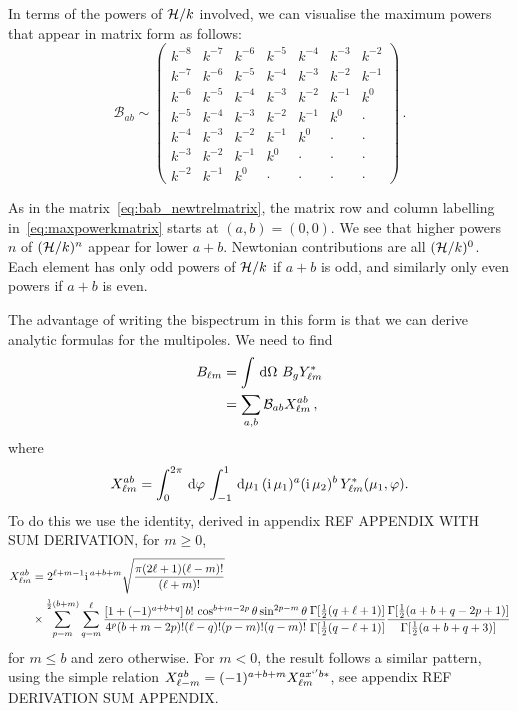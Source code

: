 In terms of the powers of $\mathcal{H}/k$ involved, we can visualise the maximum powers that appear in matrix form as follows:
\begin{equation}  \label{eq:maxpowerkmatrix}
\mathcal{B}_{ab}\sim \left( \begin {array}{ccccccc} {k}^{-8}&{k}^{-7}&{k}^{-6}&{k}^{-5}&{k
}^{-4}&{k}^{-3}&{k}^{-2}\\  
{k}^{-7}&{k}^{-6}&{k}^{-5
}&{k}^{-4}&{k}^{-3}&{k}^{-2}&{k}^{-1}\\  
{k}^{-6}&{k}
^{-5}&{k}^{-4}&{k}^{-3}&{k}^{-2}&{k}^{-1}&k^0\\  
{k}^{-
5}&{k}^{-4}&{k}^{-3}&{k}^{-2}&{k}^{-1}&k^0 & \cdot\\  
{k}^{-4
}&{k}^{-3}&{k}^{-2}&{k}^{-1}&k^0 &\cdot &\cdot \\  
{k}^{-3}&{k}^{-
2}&{k}^{-1}&k^0 & \cdot&\cdot &\cdot \\  
{k}^{-2}&{k}^{-1}&k^0 &\cdot & \cdot&\cdot & \cdot
\end {array} \right) \,.
\end{equation}

As in the matrix~\eqref{eq:bab_newtrelmatrix}, the matrix row and column labelling in~\eqref{eq:maxpowerkmatrix} starts at $(a,b) = (0,0)$. We see that higher powers $n$ of $(\mathcal{H}/k)^n$ appear for lower $a+b$. Newtonian contributions are all $({\cal H}/k)^0$. Each element has only odd powers of $\mathcal{H}/k$ if $a+b$ is odd, and similarly only even powers if $a+b$ is even.

The advantage of writing the bispectrum in this form is that we can derive analytic formulas for the multipoles. We need to find
\begin{align}
B_{\ell m} &= \int{\,\mathrm{d}}\Omega \,\,B_g Y^*_{\ell m} \nonumber \\
&= \sum_{a,b} \mathcal{B}_{ab} X_{\ell m}^{ab} \label{eq:xabexp} \,,
\end{align}
where 
\begin{equation} X_{\ell m}^{ab} = \int_0^{2\pi} \,\mathrm{d}\varphi\, \int_{-1}^1 \,\mathrm{d}\mu_1\, (\mathrm{i\,} \mu_1)^a (\mathrm{i\,} \mu_2)^b \,Y_{\ell m}^*(\mu_1,\varphi).
\end{equation}
To do this we use the identity, derived in appendix REF APPENDIX WITH SUM DERIVATION, for $m \geq 0$,
\begin{align}\label{eq:sumformula} X_{\ell m}^{ab} &= 2^{\ell+m-1}\mathrm{i\,}^{a+b+m}\sqrt{\frac{\pi(2\ell+1)(\ell-m)!}{(\ell+m)!}}\nonumber\\
&\times
\sum_{p=m}^{\frac{1}{2}(b+m)}\sum_{q=m}^{\ell}
\frac{[1+(-1)^{a+b+q}]\,b!\,\cos^{b+m-2p}\theta\sin^{2p-m}\theta}{4^p(b+m-2p)!(\ell-q)!(p-m)!(q-m)!}
\frac{\Gamma[\frac{1}{2}(q+\ell+1)]}{\Gamma[\frac{1}{2}(q-\ell+1)]}
\frac{\Gamma[\frac{1}{2}(a+b +q-2p+1)]}{\Gamma[\frac{1}{2}(a+b+q+3)]}
\end{align}
for $m\leq b$ and zero otherwise. For $m < 0$, the result follows a similar pattern, using the simple relation \(X_{\ell -m}^{ab} = (-1)^{a+b+m} X_{\ell m}^{ax`'b*}\), see appendix REF DERIVATION SUM APPENDIX. 


